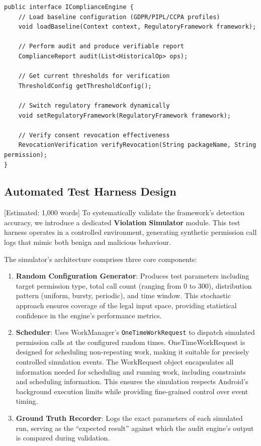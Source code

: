 \begin{lstlisting}[caption=IComplianceEngine core interface with regulatory audit support]
public interface IComplianceEngine {
    // Load baseline configuration (GDPR/PIPL/CCPA profiles)
    void loadBaseline(Context context, RegulatoryFramework framework);
    
    // Perform audit and produce verifiable report
    ComplianceReport audit(List<HistoricalOp> ops);
    
    // Get current thresholds for verification
    ThresholdConfig getThresholdConfig();
    
    // Switch regulatory framework dynamically
    void setRegulatoryFramework(RegulatoryFramework framework);
    
    // Verify consent revocation effectiveness
    RevocationVerification verifyRevocation(String packageName, String permission);
}
\end{lstlisting}

\subsection{Automated Test Harness Design} [Estimated: 1,000 words]
To systematically validate the framework's detection accuracy, we introduce a dedicated \textbf{Violation Simulator} module. This test harness operates in a controlled environment, generating synthetic permission call logs that mimic both benign and malicious behaviour.

The simulator's architecture comprises three core components:
\begin{enumerate}
\item \textbf{Random Configuration Generator}: Produces test parameters including target permission type, total call count (ranging from 0 to 300), distribution pattern (uniform, bursty, periodic), and time window. This stochastic approach ensures coverage of the legal input space, providing statistical confidence in the engine's performance metrics.
\item \textbf{Scheduler}: Uses WorkManager's \texttt{OneTimeWorkRequest} to dispatch simulated permission calls at the configured random times. OneTimeWorkRequest is designed for scheduling non-repeating work, making it suitable for precisely controlled simulation events. The WorkRequest object encapsulates all information needed for scheduling and running work, including constraints and scheduling information. This ensures the simulation respects Android's background execution limits while providing fine-grained control over event timing.
\item \textbf{Ground Truth Recorder}: Logs the exact parameters of each simulated run, serving as the ``expected result'' against which the audit engine's output is compared during validation.
\end{enumerate}

